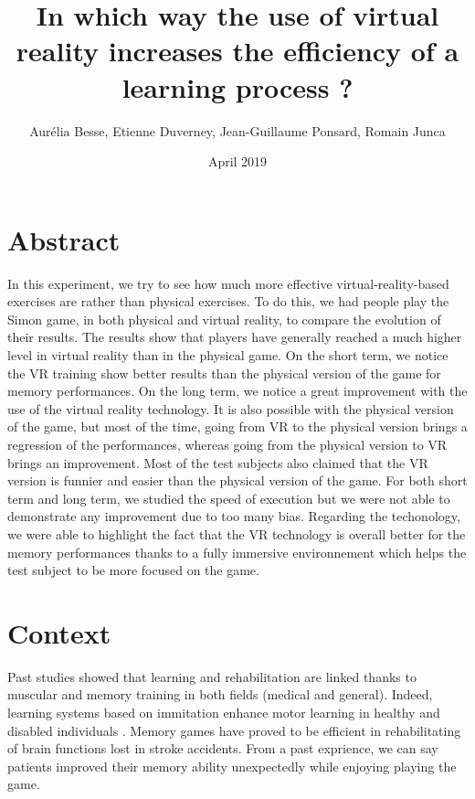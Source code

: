 \documentclass[12pt, openany, twocolumn]{article}
\title{In which way the use of virtual reality increases the efficiency of a learning process ?}
\author{ Aurélia Besse, Etienne Duverney, Jean-Guillaume Ponsard, Romain Junca }
\date{April 2019}
\begin{document}
\maketitle
\section{Abstract}

In this experiment, we try to see how much more effective virtual-reality-based exercises are rather than physical exercises. 
To do this, we had people play the Simon game, in both physical and virtual reality, to compare the evolution of their results. 
The results show that players have generally reached a much higher level in virtual reality than in the physical game.
On the short term, we notice the VR training show better results than the physical version of the game for memory performances. 
On the long term, we notice a great improvement with the use of the virtual reality technology. It is also possible with the physical version of the game, but most of the time, going from VR to the physical version brings a regression of the performances, whereas going from the physical version to VR brings an improvement.
Most of the test subjects also claimed that the VR version is funnier and easier than the physical version of the game.
For both short term and long term, we studied the speed of execution but we were not able to demonstrate any improvement due to too many bias.
Regarding the techonology, we were able to highlight the fact that the VR technology is overall better for the memory performances thanks to a fully immersive environnement which helps the test subject to be more focused on the game.

\maketitle
\section{Context} 
Past studies showed that learning and rehabilitation are linked thanks to muscular and memory training in both fields (medical and general). 
Indeed, learning systems based on immitation enhance motor learning in healthy and disabled individuals \cite{holdenUseVirtualEnvironments, bastianUnderstandingSensorimotorAdaptation2008b}.
Memory games have proved to be efficient in rehabilitating of brain functions lost in stroke accidents. From a past exprience, we can say patients improved their memory ability unexpectedly while enjoying playing the game.
\\ 
\end{document}
